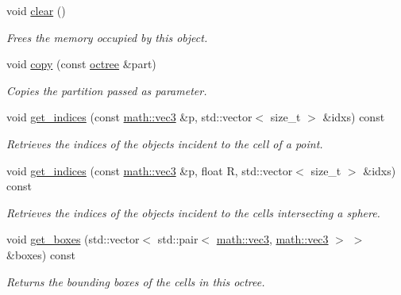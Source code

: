 \begin{DoxyCompactItemize}
\mbox{\label{classphysim_1_1structures_1_1octree_a67b90846b173c0f34606d0f718d44497}} 
void \hyperlink{classphysim_1_1structures_1_1octree_a67b90846b173c0f34606d0f718d44497}{clear} ()
\begin{DoxyCompactList}\small\item\em Frees the memory occupied by this object. \end{DoxyCompactList}\item 
void \hyperlink{classphysim_1_1structures_1_1octree_aefdcd3e41277fa5d639dc9452361cba5}{copy} (const \hyperlink{classphysim_1_1structures_1_1octree}{octree} \&part)
\begin{DoxyCompactList}\small\item\em Copies the partition passed as parameter. \end{DoxyCompactList}\item 
void \hyperlink{classphysim_1_1structures_1_1octree_a5416f8bedbc67dbb4b0d7614c7ef811a}{get\+\_\+indices} (const \hyperlink{structphysim_1_1math_1_1vec3}{math\+::vec3} \&p, std\+::vector$<$ size\+\_\+t $>$ \&idxs) const
\begin{DoxyCompactList}\small\item\em Retrieves the indices of the objects incident to the cell of a point. \end{DoxyCompactList}\item 
void \hyperlink{classphysim_1_1structures_1_1octree_a808087da71c7499ca78613f770b0083e}{get\+\_\+indices} (const \hyperlink{structphysim_1_1math_1_1vec3}{math\+::vec3} \&p, float R, std\+::vector$<$ size\+\_\+t $>$ \&idxs) const
\begin{DoxyCompactList}\small\item\em Retrieves the indices of the objects incident to the cells intersecting a sphere. \end{DoxyCompactList}\item 
void \hyperlink{classphysim_1_1structures_1_1octree_ab113e2fd11a5c146a4c35c6f3e8db63c}{get\+\_\+boxes} (std\+::vector$<$ std\+::pair$<$ \hyperlink{structphysim_1_1math_1_1vec3}{math\+::vec3}, \hyperlink{structphysim_1_1math_1_1vec3}{math\+::vec3} $>$ $>$ \&boxes) const
\begin{DoxyCompactList}\small\item\em Returns the bounding boxes of the cells in this octree. \end{DoxyCompactList}\end{DoxyCompactItemize}
